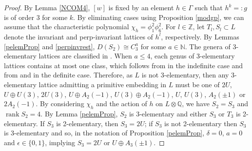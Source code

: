 \documentclass[12pt, a4paper]{article}
\newcommand{\ZZ}{\mathbb{Z}}
\newcommand{\QQ}{\mathbb{Q}}
\newcommand{\NN}{\mathbb{N}}
\newcommand{\opn}{\operatorname}
\newcommand{\op}{\oplus}
\begin{document}
\begin{proof}
  By Lemma \ref{NCOM4}, $[w]$ is fixed by an element $h \in \Gamma$ such that $h^k=:g$ is of order 3 for some $k$.
  By eliminating cases using Proposition \ref{modgp},  we can assume that the characteristic polynomial $\chi_h = \phi_1^2 \phi_6^2$.
  For $l \in \ZZ$, let $T_l, S_l \subset L$ denote the invariant and perp-invariant lattices of $h^l$, respectively.
  By Lemmas \ref{pelemProp} and \ref{perpinvrest}, $D(S_2) \cong C_3^a$ for some $a \in \NN$.
  The genera of 3-elementary lattices are classified in \cite[Theorem 13, p.386]{SPLAG}.
  When $a \leq 4$, each genus of 3-elementary lattices contains at most one class, which follows from \cite[Corollary 22, p.395]{SPLAG} in the indefinite case and from \cite[Table 15.1, p.360]{SPLAG} and \cite{Nipp} in the definite case.
  Therefore, as $L$ is not 3-elementary, then any 3-elementary lattice admitting a primitive embedding in $L$ must be one of 
  $2U$,
  $U \op U(3)$,
  $2U(3)$,
  $U \op A_2(-1)$,
  $U(3) \op A_2(-1)$,
  $U$,
  $U(3)$,
  $A_2 (\pm 1)$  or
  $2A_2(-1)$.
  By considering $\chi_h$ and the action of $h$ on $L \otimes \QQ$, we have $S_2 = S_3$ and $\opn{rank} S_2 = 4$.
  By Lemma \ref{pelemProp}, $S_2$ is 3-elementary and either $S_3$ or $T_3$ is 2-elementary.
  If $S_3$ is 2-elementary, then $S_3=2U$; 
  if $S_3$ is not 2-elementary then $S_3$ is 3-elementary and so, in the notation of Proposition \ref{pelemProp}, $\delta=0$, $a=0$ and $\epsilon \in \{0, 1 \}$, implying $S_3 = 2U$ or $U \op A_3(\pm 1)$. 
\end{proof}
\end{document}
